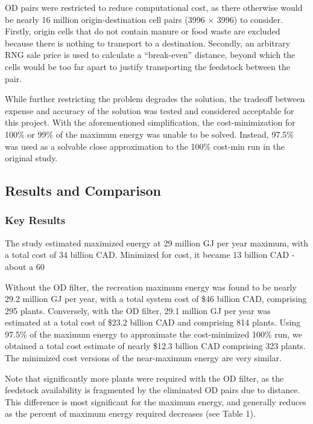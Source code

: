 \documentclass[12pt]{article}
\begin{document}
OD pairs were restricted to reduce computational cost, as there otherwise would be nearly 16 million origin-destination cell pairs (3996 $\times$ 3996) to consider. Firstly, origin cells that do not contain manure or food waste are excluded because there is nothing to transport to a destination. Secondly, an arbitrary RNG sale price is used to calculate a “break-even” distance, beyond which the cells would be too far apart to justify transporting the feedstock between the pair. 

While further restricting the problem degrades the solution, the tradeoff between expense and accuracy of the solution was tested and considered acceptable for this project. With the aforementioned simplification, the cost-minimization for 100\% or 99\% of the maximum energy was unable to be solved. Instead, 97.5\% was used as a solvable close approximation to the 100\% cost-min run in the original study. 


\subsection{Results and Comparison}

\subsubsection{Key Results}
The study estimated maximized energy at 29 million GJ per year maximum, with a total cost of 34 billion CAD. Minimized for cost, it became 13 billion CAD - about a 60%

Without the OD filter, the recreation maximum energy was found to be nearly 29.2 million GJ per year, with a total system cost of \$46 billion CAD, comprising 295 plants. Conversely, with the OD filter, 29.1 million GJ per year was estimated at a total cost of \$23.2 billion CAD and comprising 814 plants. Using 97.5\% of the maximum energy to approximate the cost-minimized 100\% run, we obtained a total cost estimate of nearly \$12.3 billion CAD comprising 323 plants. The minimized cost versions of the near-maximum energy are very similar.

Note that significantly more plants were required with the OD filter, as the feedstock availability is fragmented by the eliminated OD pairs due to distance. This difference is most significant for the maximum energy, and generally reduces as the percent of maximum energy required decreases (see Table 1).
\end{document}
